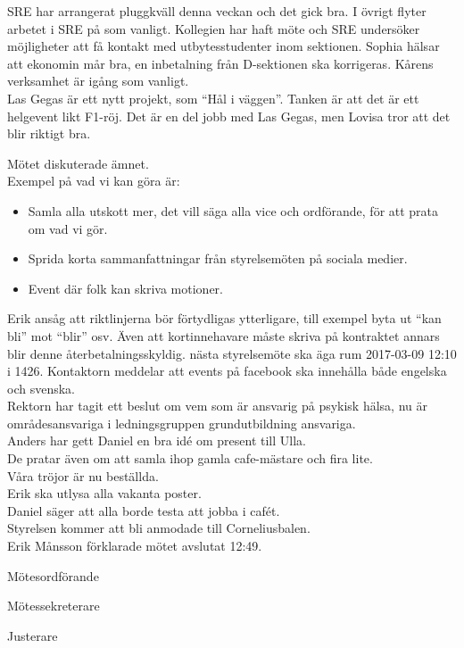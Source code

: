 \documentclass[10pt]{article}
\def\mo{Erik Månsson}
\def\ms{Johan Karlberg}
\def\ji{Albin Nyström Eklund}
\begin{document}
\begin{paragrafer}
\begin{paragrafer}
SRE har arrangerat pluggkväll denna veckan och det gick bra. I övrigt flyter arbetet i SRE på som vanligt. Kollegien har haft möte och SRE undersöker möjligheter att få kontakt med utbytesstudenter inom sektionen.
Sophia hälsar att ekonomin mår bra, en inbetalning från D-sektionen ska korrigeras.
Kårens verksamhet är igång som vanligt.\\
Las Gegas är ett nytt projekt, som ``Hål i väggen''. Tanken är att det är ett helgevent likt F1-röj. Det är en del jobb med Las Gegas, men Lovisa tror att det blir riktigt bra.
\end{paragrafer}
Mötet diskuterade ämnet.\\
Exempel på vad vi kan göra är:
\begin{itemize}
  \item Samla alla utskott mer, det vill säga alla vice och ordförande, för att prata om vad vi gör.
  \item Sprida korta sammanfattningar från styrelsemöten på sociala medier.
  \item Event där folk kan skriva motioner.
\end{itemize}
Erik ansåg att riktlinjerna bör förtydligas ytterligare, till exempel byta ut ``kan bli'' mot ``blir'' osv. Även att kortinnehavare måste skriva på kontraktet annars blir denne återbetalningsskyldig.
{\Mba} nästa styrelsemöte ska äga rum 2017-03-09 12:10 i 1426.
{\Ibfu}
Kontaktorn meddelar att events på facebook ska innehålla både engelska och svenska.\\
Rektorn har tagit ett beslut om vem som är ansvarig på psykisk hälsa, nu är områdesansvariga i ledningsgruppen grundutbildning ansvariga.\\
Anders har gett Daniel en bra idé om present till Ulla.\\
De pratar även om att samla ihop gamla cafe-mästare och fira lite.\\
Våra tröjor är nu beställda.\\
Erik ska utlysa alla vakanta poster.\\
Daniel säger att alla borde testa att jobba i cafét.\\
Styrelsen kommer att bli anmodade till Corneliusbalen.\\
{\mo} förklarade mötet avslutat 12:49.

\end{paragrafer}

\newpage
\hidesignfoot
\begin{signatures}{3}
\signature{\mo}{Mötesordförande}
\signature{\ms}{Mötessekreterare}
\signature{\ji}{Justerare}
\end{signatures}
\end{document}
